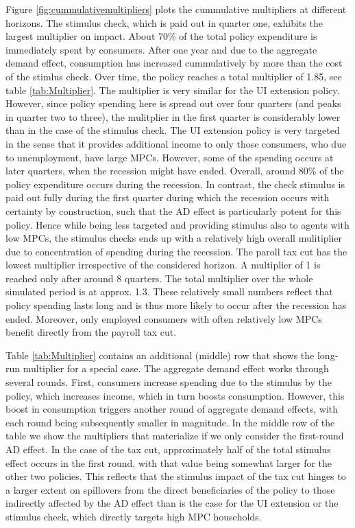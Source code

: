 \documentclass[../HAFiscal]{subfiles}
\begin{document}
Figure \ref{fig:cummulativemultipliers} plots the cummulative multipliers at different horizons. The stimulus check, which is paid out in quarter one, exhibits the largest multiplier on impact. About 70\% of the total policy expenditure is immediately spent by consumers. After one year and due to the aggregate demand effect, consumption has increased cummulatively by more than the cost of the stimlus check. Over time, the policy reaches a total multiplier of 1.85, see table \ref{tab:Multiplier}.
The multiplier is very similar for the UI extension policy. However, since policy spending here is spread out over four quarters (and peaks in quarter two to three), the mulitplier in the first quarter is considerably lower than in the case of the stimulus check. 
The UI extension policy is very targeted in the sense that it provides additional income to only those consumers, who due to unemployment, have large MPCs. However, some of the spending occurs at later quarters, when the recession might have ended. Overall, around 80\% of the policy expenditure occurs during the recession. In contrast, the check stimulus is paid out fully during the first quarter during which the recession occurs with certainty by construction, such that the AD effect is particularly potent for this policy. Hence while being less targeted and providing stimulus also to agents with low MPCs, the stimulus checks ends up with a relatively high overall mulitiplier due to concentration of spending during the recession.
The paroll tax cut has the lowest multiplier irrespective of the considered horizon. A multiplier of 1 is reached only after around 8 quarters. The total multiplier over the whole simulated period is at approx. 1.3. These relatively small numbers reflect that policy spending lasts long and is thus more likely to occur after the recession has ended. Moreover, only employed consumers with often relatively low MPCs benefit directly from the payroll tax cut. 

Table \ref{tab:Multiplier} contains an additional (middle) row that shows the long-run multiplier for a special case. The aggregate demand effect works through several rounds. First, consumers increase spending due to the stimulus by the policy, which increases income, which in turn boosts consumption. However, this boost in consumption triggers another round of aggregate demand effects, with each round being subsequently smaller in magnitude. In the middle row of the table we show the multipliers that materialize if we only consider the first-round AD effect. In the case of the tax cut, approximately half of the total stimulus effect occurs in the first round, with that value being somewhat larger for the other two policies. This reflects that the stimulus impact of the tax cut hinges to a larger extent on spillovers from the direct beneficiaries of the policy to those indirectly affected by the AD effect than is the case for the UI extension or the stimulus check, which directly targets high MPC households.
\end{document}

